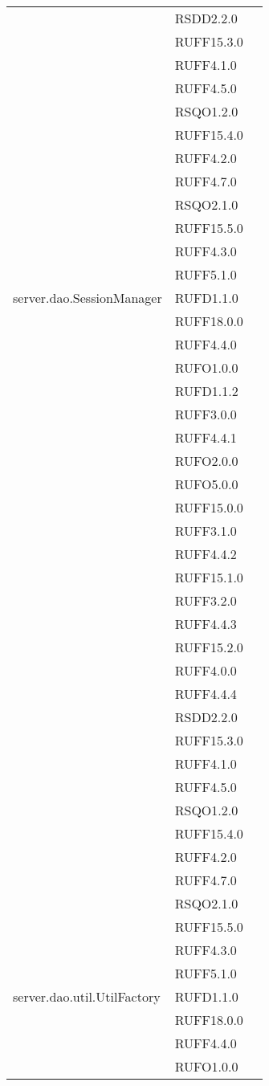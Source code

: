 \begin{center}
\begin{longtable}{lp{}l}
 & RSDD2.2.0 \\
 & RUFF15.3.0 \\
 & RUFF4.1.0 \\
 & RUFF4.5.0 \\
 & RSQO1.2.0 \\
 & RUFF15.4.0 \\
 & RUFF4.2.0 \\
 & RUFF4.7.0 \\
 & RSQO2.1.0 \\
 & RUFF15.5.0 \\
 & RUFF4.3.0 \\
 & RUFF5.1.0 \\
server.dao.SessionManager & RUFD1.1.0 \\
 & RUFF18.0.0 \\
 & RUFF4.4.0 \\
 & RUFO1.0.0 \\
 & RUFD1.1.2 \\
 & RUFF3.0.0 \\
 & RUFF4.4.1 \\
 & RUFO2.0.0 \\
 & RUFO5.0.0 \\
 & RUFF15.0.0 \\
 & RUFF3.1.0 \\
 & RUFF4.4.2 \\
 & RUFF15.1.0 \\
 & RUFF3.2.0 \\
 & RUFF4.4.3 \\
 & RUFF15.2.0 \\
 & RUFF4.0.0 \\
 & RUFF4.4.4 \\
 & RSDD2.2.0 \\
 & RUFF15.3.0 \\
 & RUFF4.1.0 \\
 & RUFF4.5.0 \\
 & RSQO1.2.0 \\
 & RUFF15.4.0 \\
 & RUFF4.2.0 \\
 & RUFF4.7.0 \\
 & RSQO2.1.0 \\
 & RUFF15.5.0 \\
 & RUFF4.3.0 \\
 & RUFF5.1.0 \\
server.dao.util.UtilFactory & RUFD1.1.0 \\
 & RUFF18.0.0 \\
 & RUFF4.4.0 \\
 & RUFO1.0.0 \\

\end{longtable}
\end{center}
